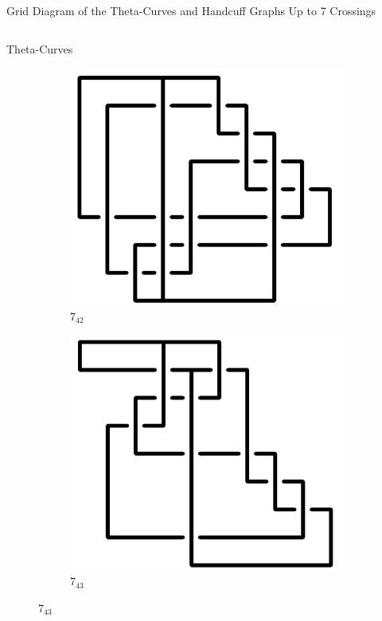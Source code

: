 \documentclass[final]{beamer}
\begin{document}
\begin{frame}[t]
\begin{alertblock}{Grid Diagram of the Theta-Curves and Handcuff Graphs Up to 7 Crossings}
\begin{columns}[t]
\begin{column}{0.5\textwidth}
\begin{alertblock}{Theta-Curves}
\begin{figure}
\begin{subfigure}{0.075\textwidth}
    \end{subfigure}
    \begin{subfigure}{0.075\textwidth}
    \includegraphics[width=\columnwidth]{../Midterm_Poster/grid_diagram/theta_7_42.png}
    \caption{$7_{42}$} 
    \end{subfigure}
    \begin{subfigure}{0.075\textwidth}
    \includegraphics[width=\columnwidth]{../Midterm_Poster/grid_diagram/theta_7_43.png}
    \caption{$7_{43}$} 

\end{subfigure}
\end{figure}
\end{alertblock}
\end{column}
\end{columns}
\end{alertblock}
\end{frame}
\end{document}
